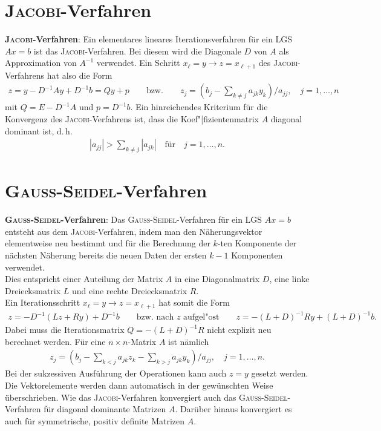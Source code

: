\section{%
    \textsc{Jacobi}-Verfahren%
}

\textbf{\textsc{Jacobi}-Verfahren}:
Ein elementares lineares Iterationsverfahren für ein LGS $Ax = b$ ist
das \textsc{Jacobi}-Verfahren.
Bei diesem wird die Diagonale $D$ von $A$ als Approximation von $A^{-1}$
verwendet.
Ein Schritt $x_\ell = y \rightarrow z = x_{\ell+1}$ des
\textsc{Jacobi}-Verfahrens hat also die Form
\begin{align*}
    z = y - D^{-1}Ay + D^{-1}b = Qy + p \qquad\text{bzw.}\qquad
    z_j = \left(b_j - \sum_{k\not=j} a_{jk}y_k\right) / a_{jj}, \quad
    j = 1, \dotsc, n
\end{align*}
mit $Q = E - D^{-1}A$ und $p = D^{-1}b$.
Ein hinreichendes Kriterium für die Konvergenz des \textsc{Jacobi}-Verfahrens
ist, dass die Koef"|fizientenmatrix $A$ diagonal dominant ist, d.\,h.
\begin{align*}
    |a_{jj}| > \sum_{k\not=j} |a_{jk}| \quad \text{für} \quad j= 1, \dotsc, n.
\end{align*}

\section{%
    \textsc{Gauss}-\textsc{Seidel}-Verfahren%
}

\textbf{\textsc{Gauss}-\textsc{Seidel}-Verfahren}:
Das \textsc{Gauss}-\textsc{Seidel}-Verfahren für ein LGS $Ax = b$ entsteht
aus dem \textsc{Jacobi}-Verfahren, indem man den Näherungsvektor elementweise
neu bestimmt und für die Berechnung der $k$-ten Komponente der nächsten
Näherung bereits die neuen Daten der ersten $k - 1$ Komponenten verwendet. \\
Dies entspricht einer Auteilung der Matrix $A$ in eine Diagonalmatrix $D$,
eine linke Dreiecksmatrix $L$ und eine rechte Dreiecksmatrix $R$. \\
Ein Iterationsschritt $x_\ell = y \rightarrow z = x_{\ell+1}$ hat somit die
Form
\begin{align*}
    z = -D^{-1}(Lz + Ry) + D^{-1}b \qquad\text{bzw. nach } z
    \text{ aufgel"ost}\qquad
    z = -(L + D)^{-1}Ry + (L + D)^{-1}b.
\end{align*}
Dabei muss die Iterationsmatrix $Q = -(L + D)^{-1}R$ nicht explizit neu
berechnet werden.
Für eine $n \times n$-Matrix $A$ ist nämlich
\begin{align*}
    z_j = \left(b_j - \sum_{k<j} a_{jk}z_k - \sum_{k>j} a_{jk}y_k\right)
    / a_{jj}, \quad j= 1, \dotsc, n.
\end{align*}
Bei der sukzessiven Ausführung der Operationen kann auch $z = y$ gesetzt
werden.
Die Vektorelemente werden dann automatisch in der gewünschten Weise
überschrieben.
Wie das \textsc{Jacobi}-Verfahren konvergiert auch das
\textsc{Gauss}-\textsc{Seidel}-Verfahren für diagonal dominante Matrizen $A$.
Darüber hinaus konvergiert es auch für symmetrische, positiv definite
Matrizen $A$.

